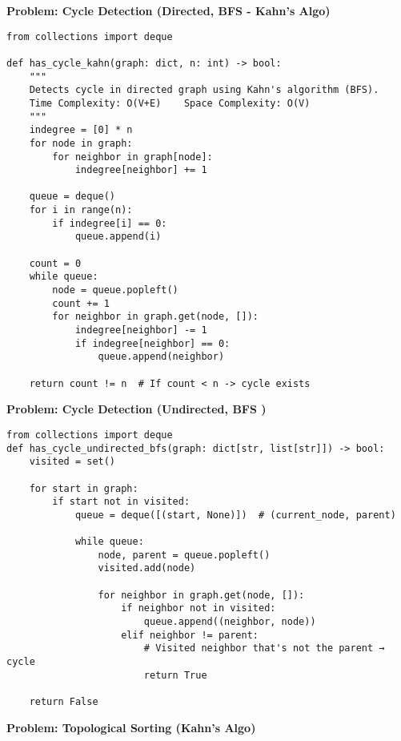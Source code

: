 \noindent\textbf{Problem: Cycle Detection (Directed, BFS - Kahn's Algo)}
\begin{verbatim}
from collections import deque

def has_cycle_kahn(graph: dict, n: int) -> bool:
    """
    Detects cycle in directed graph using Kahn's algorithm (BFS).
    Time Complexity: O(V+E)    Space Complexity: O(V)
    """
    indegree = [0] * n
    for node in graph:
        for neighbor in graph[node]:
            indegree[neighbor] += 1
    
    queue = deque()
    for i in range(n):
        if indegree[i] == 0:
            queue.append(i)
    
    count = 0
    while queue:
        node = queue.popleft()
        count += 1
        for neighbor in graph.get(node, []):
            indegree[neighbor] -= 1
            if indegree[neighbor] == 0:
                queue.append(neighbor)
    
    return count != n  # If count < n -> cycle exists
\end{verbatim}
\noindent\textbf{Problem: Cycle Detection (Undirected, BFS )}
\begin{verbatim}
from collections import deque
def has_cycle_undirected_bfs(graph: dict[str, list[str]]) -> bool:
    visited = set()

    for start in graph:
        if start not in visited:
            queue = deque([(start, None)])  # (current_node, parent)

            while queue:
                node, parent = queue.popleft()
                visited.add(node)

                for neighbor in graph.get(node, []):
                    if neighbor not in visited:
                        queue.append((neighbor, node))
                    elif neighbor != parent:
                        # Visited neighbor that's not the parent → cycle
                        return True

    return False
\end{verbatim}
\noindent\textbf{Problem: Topological Sorting (Kahn's Algo)}
